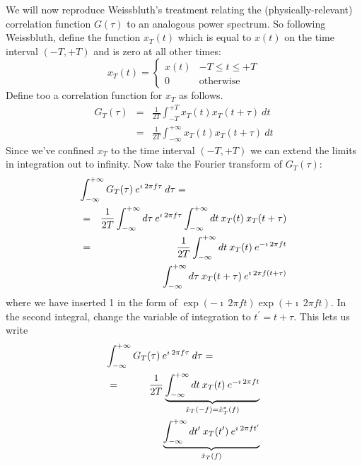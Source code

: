 We will now reproduce Weissbluth's treatment relating the
(physically-relevant) correlation function $G(\tau)$ to an analogous
power spectrum.  So following Weissbluth, define the function
$x_{T}(t)$ which is equal to $x(t)$ on the time interval $(-T,+T)$ and
is zero at all other times:
\begin{equation}
x_{T}(t) = \left\{ \begin{array}{cc} x(t) & -T \leq t \leq +T \\ 0 & \mbox{otherwise} \end{array} \right.
\end{equation}
Define too a correlation function for $x_T$ as follows.
\begin{eqnarray}
G_{T}(\tau) & = & \frac{1}{2 T} \int_{-T}^{+T} x_T(t) x_T(t+\tau) \: dt \\
            & = & \frac{1}{2 T} \int_{-\infty}^{+\infty} x_T(t) x_T(t+\tau) \: dt
\end{eqnarray}
Since we've confined $x_T$ to the time interval $(-T,+T)$ we can
extend the limits in integration out to infinity.  Now take the
Fourier transform of $G_{T}(\tau)$:
\begin{eqnarray*}
\lefteqn{\int_{-\infty}^{+\infty} G_{T}(\tau) \: e^{\imath \: 2 \pi f \tau} \: d\tau =} \\
& = & \frac{1}{2 T} \int_{-\infty}^{+\infty} d\tau \: e^{\imath \: 2 \pi f \tau} \int_{-\infty}^{+\infty} dt \: x_{T}(t) \: x_{T}(t+\tau) \\
& = & \frac{1}{2 T} \int_{-\infty}^{+\infty} dt \: x_{T}(t) \: e^{-\imath \: 2 \pi f t} \\
&   & \hspace{0.5in}\int_{-\infty}^{+\infty} d\tau \:  x_{T}(t+\tau) \: e^{\imath \: 2 \pi f (t+\tau)}
\end{eqnarray*}
where we have inserted 1 in the form of $\exp{(-\imath \: 2 \pi f t)}
\exp{(+\imath \: 2 \pi f t)}$.  In the second integral, change the
variable of integration to $t^{\prime} = t+\tau$.  This lets us write
\begin{eqnarray*}
\lefteqn{\int_{-\infty}^{+\infty} G_{T}(\tau) \: e^{\imath \: 2 \pi f \tau} \: d\tau =} \\
& = & \frac{1}{2 T} \underbrace{\int_{-\infty}^{+\infty} dt \: x_{T}(t) \: e^{-\imath \: 2 \pi f t}}_{{\hat{x}}_T(-f) = {\hat{x}}^{*}_{T}(f)} \\
&   & \hspace{0.5in} \underbrace{\int_{-\infty}^{+\infty} dt^{\prime} \:  x_{T}(t^{\prime}) \: e^{\imath \: 2 \pi f t^{\prime}}}_{{\hat{x}}_T(f)}
\end{eqnarray*}
